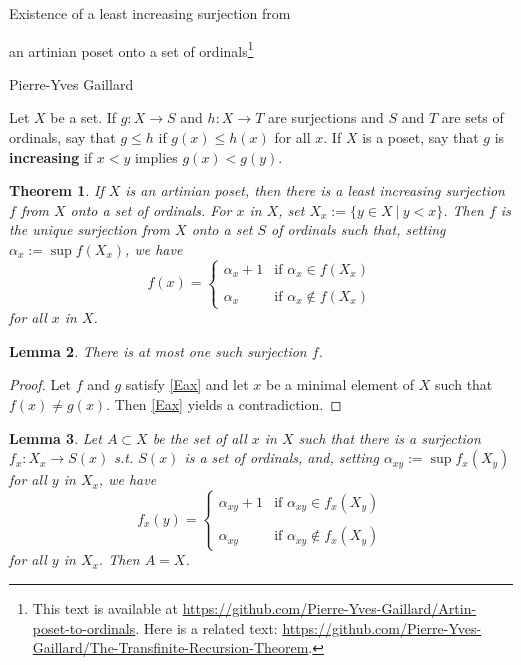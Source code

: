 \documentclass[11pt,letterpaper]{article}
\newtheorem{thm}{Theorem}%
\newtheorem{lem}[thm]{Lemma}
\newcommand{\noi}{\noindent}
\begin{document}
\begin{center}
{\Large Existence of a least increasing surjection from 

an artinian poset onto a set of ordinals\footnote{This text is available at \url{https://github.com/Pierre-Yves-Gaillard/Artin-poset-to-ordinals}. Here is a related text: \url{https://github.com/Pierre-Yves-Gaillard/The-Transfinite-Recursion-Theorem}.}}\medskip 

{\small Pierre-Yves Gaillard}
\end{center}

\noi Let $X$ be a set. If $g:X\to S$ and $h:X\to T$ are surjections and $S$ and $T$ are sets of ordinals, say that $g\le h$ if $g(x)\le h(x)$ for all $x$. If $X$ is a poset, say that $g$ is \textbf{increasing} if $x<y$ implies $g(x)<g(y)$. 

\begin{thm}\label{T1}
If $X$ is an artinian poset, then there is a least increasing surjection $f$ from $X$ onto a set of ordinals. For $x$ in $X$, set $X_x:=\{y\in X\ |\ y<x\}$. Then $f$ is the unique surjection from $X$ onto a set $S$ of ordinals such that, setting $\alpha_x:=\sup f(X_x)$, we have 
\begin{equation}\label{Eax}
f(x)=
\begin{cases}
\alpha_x+1&\text{if }\alpha_x\in f(X_x)\\ \\ 
\alpha_x&\text{if }\alpha_x\notin f(X_x)
\end{cases}
\end{equation} 
for all $x$ in $X$. 
\end{thm}

\begin{lem}\label{L2} 
There is at most one such surjection $f$. 
\end{lem} 

\begin{proof}
Let $f$ and $g$ satisfy \eqref{Eax} and let $x$ be a minimal element of $X$ such that $f(x)\ne g(x)$. Then \eqref{Eax} yields a contradiction. 
\end{proof} 

\begin{lem}\label{L3} 
Let $A\subset X$ be the set of all $x$ in $X$ such that there is a surjection $f_x:X_x\to S(x)$ s.t. $S(x)$ is a set of ordinals, and, setting $\alpha_{xy}:=\sup f_x(X_y)$ for all $y$ in $X_x$, we have 
\begin{equation}\label{Eaxy}
f_x(y)=
\begin{cases}
\alpha_{xy}+1&\text{if }\alpha_{xy}\in f_x(X_y)\\ \\ 
\alpha_{xy}&\text{if }\alpha_{xy}\notin f_x(X_y)
\end{cases}
\end{equation} 
for all $y$ in $X_x$. Then $A=X$. 
\end{lem} 
\end{document}
